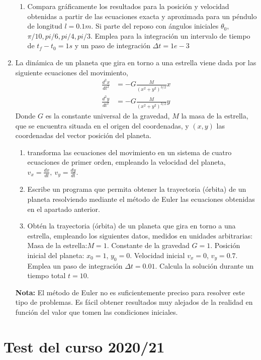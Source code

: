 \begin{enumerate}
\begin{enumerate}
\item Compara gráficamente los resultados para la posición y velocidad obtenidas a partir de las ecuaciones exacta y aproximada para un péndulo de longitud $l=0.1m$. Si parte del reposo con ángulos iniciales $\theta_0$, $\pi/10, pi/6, pi/4, pi/3$. Emplea para la integración un intervalo de tiempo de $t_f-t_0 = 1s$ y un paso de integración $\Delta t=1e-3$
\end{enumerate}
\item La dinámica de un planeta que gira en torno a una estrella viene dada por las siguiente ecuaciones del movimiento,
\begin{align*}
\frac{d^2x}{dt^2} &= -G\frac{M}{(x^2+y^2)^{3/2}}x\\
\frac{d^2y}{dt^2} &= -G\frac{M}{(x^2+y^2)^{3/2}}y
\end{align*}
Donde $G$ es la constante universal de la gravedad, $M$ la masa de la estrella, que se encuentra situada en el origen del coordenadas, y $(x,y)$ las coordenadas del vector posición del planeta.
\begin{enumerate}
\item transforma las ecuaciones del movimiento en un sistema de cuatro ecuaciones de primer orden, empleando la velocidad del planeta, $v_x = \frac{dx}{dt},\ v_y = \frac{dy}{dt} $. 
\item Escribe un programa que permita obtener la trayectoria (órbita) de un planeta resolviendo mediante el método de Euler las ecuaciones obtenidas en el apartado anterior.
\item Obtén la trayectoria (órbita) de un planeta que gira en torno a una estrella, empleando los siguientes datos, medidos en unidades arbitrarias: Masa de la estrella:$M=1$. Constante de la gravedad $G=1$. Posición inicial del planeta: $x_0 = 1$, $y_0=0$. Velocidad inicial $v_x = 0$, $v_y = 0.7$. Emplea un paso de integración $\Delta t =0.01$. Calcula la solución durante un tiempo total $t = 10$.
\end{enumerate}
\textbf{Nota:} El método de Euler no es suficientemente preciso para resolver este tipo de problemas. Es fácil obtener resultados muy alejados de la realidad en función del valor que tomen las condiciones iniciales. 
\end{enumerate}

\section{Test del curso 2020/21}

